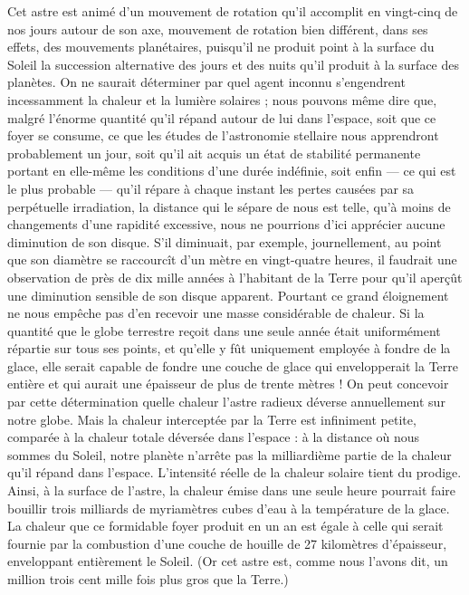 \documentclass[a4paper, 11pt, oneside, landscape]{article}
\begin{document}
Cet astre est animé d'un mouvement de rotation qu'il accomplit en vingt-cinq de nos jours autour de son axe, mouvement de rotation bien différent, dans ses effets, des mouvements planétaires, puisqu'il ne produit point à la surface du Soleil la succession alternative des jours et des nuits qu'il produit à la surface des planètes. On ne saurait déterminer par quel agent inconnu s'engendrent incessamment la chaleur et la lumière solaires ; nous pouvons même dire que, malgré l'énorme quantité qu'il répand autour de lui dans l'espace, soit que ce foyer se consume, ce que les études de l'astronomie stellaire nous apprendront probablement un jour, soit qu'il ait acquis un état de stabilité permanente portant en elle-même les conditions d'une durée indéfinie, soit enfin --- ce qui est le plus probable --- qu'il répare à chaque instant les pertes causées par sa perpétuelle irradiation, la distance qui le sépare de nous est telle, qu'à moins de changements d'une rapidité excessive, nous ne pourrions d'ici apprécier aucune diminution de son disque. S'il diminuait, par exemple, journellement, au point que son diamètre se raccourcît d'un mètre en vingt-quatre heures, il faudrait une observation de près de dix mille années à l'habitant de la Terre pour qu'il aperçût une diminution sensible de son disque apparent. Pourtant ce grand éloignement ne nous empêche pas d'en recevoir une masse considérable de chaleur. Si la quantité que le globe terrestre reçoit dans une seule année était uniformément répartie sur tous ses points, et qu'elle y fût uniquement employée à fondre de la glace, elle serait capable de fondre une couche de glace qui envelopperait la Terre entière et qui aurait une épaisseur de plus de trente mètres ! On peut concevoir par cette détermination quelle chaleur l'astre radieux déverse annuellement sur notre globe. Mais la chaleur interceptée par la Terre est infiniment petite, comparée à la chaleur totale déversée dans l'espace : à la distance où nous sommes du Soleil, notre planète n'arrête pas la milliardième partie de la chaleur qu'il répand dans l'espace. L'intensité réelle de la chaleur solaire tient du prodige. Ainsi, à la surface de l'astre, la chaleur émise dans une seule heure pourrait faire bouillir trois milliards de myriamètres cubes d'eau à la température de la glace. La chaleur que ce formidable foyer produit en un an est égale à celle qui serait fournie par la combustion d'une couche de houille de 27 kilomètres d'épaisseur, enveloppant entièrement le Soleil. (Or cet astre est, comme nous l'avons dit, un million trois cent mille fois plus gros que la Terre.)
\end{document}

